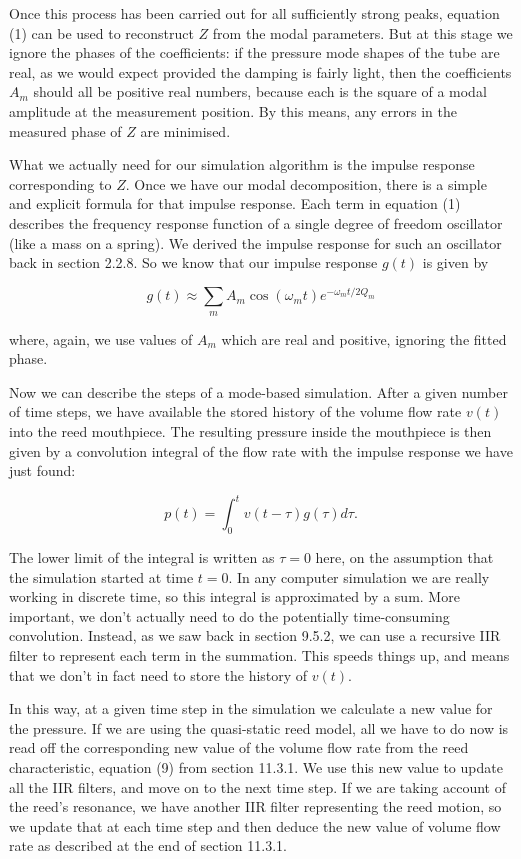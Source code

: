   Once this process has been carried out for all sufficiently strong peaks, 
  equation (1) can be used to reconstruct $Z$ from the modal parameters. But at 
  this stage we ignore the phases of the coefficients: if the pressure mode 
  shapes of the tube are real, as we would expect provided the damping is 
  fairly light, then the coefficients $A_m$ should all be positive real 
  numbers, because each is the square of a modal amplitude at the measurement 
  position. By this means, any errors in the measured phase of $Z$ are 
  minimised. 

  What we actually need for our simulation algorithm is the impulse response 
  corresponding to $Z$. Once we have our modal decomposition, there is a simple 
  and explicit formula for that impulse response. Each term in equation (1) 
  describes the frequency response function of a single degree of freedom 
  oscillator (like a mass on a spring). We derived the impulse response for 
  such an oscillator back in section 2.2.8. So we know that our impulse 
  response $g(t)$ is given by 

  $$g(t) \approx \sum_m{A_m \cos(\omega_m t) e^{-\omega_m t/2Q_m}} \tag{2}$$ 

  where, again, we use values of $A_m$ which are real and positive, ignoring 
  the fitted phase. 

  Now we can describe the steps of a mode-based simulation. After a given 
  number of time steps, we have available the stored history of the volume flow 
  rate $v(t)$ into the reed mouthpiece. The resulting pressure inside the 
  mouthpiece is then given by a convolution integral of the flow rate with the 
  impulse response we have just found: 

  $$p(t) = \int_0^t{v(t-\tau) g(\tau) d \tau} . \tag{3}$$ 

  The lower limit of the integral is written as $\tau=0$ here, on the 
  assumption that the simulation started at time $t=0$. In any computer 
  simulation we are really working in discrete time, so this integral is 
  approximated by a sum. More important, we don’t actually need to do the 
  potentially time-consuming convolution. Instead, as we saw back in section 
  9.5.2, we can use a recursive IIR filter to represent each term in the 
  summation. This speeds things up, and means that we don’t in fact need to 
  store the history of $v(t)$. 

  In this way, at a given time step in the simulation we calculate a new value 
  for the pressure. If we are using the quasi-static reed model, all we have to 
  do now is read off the corresponding new value of the volume flow rate from 
  the reed characteristic, equation (9) from section 11.3.1. We use this new 
  value to update all the IIR filters, and move on to the next time step. If we 
  are taking account of the reed’s resonance, we have another IIR filter 
  representing the reed motion, so we update that at each time step and then 
  deduce the new value of volume flow rate as described at the end of section 
  11.3.1. 